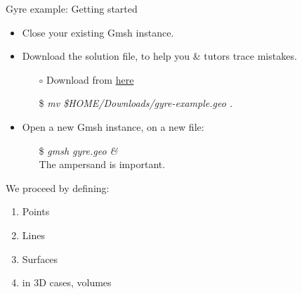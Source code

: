 \documentclass[t]{beamer}
\begin{document}
\begin{frame}{Gyre example: Getting started}
    \begin{itemize}
        \item Close your existing Gmsh instance.
        \item Download the solution file, to help you \& tutors trace mistakes.
        \begin{itemize}
            \item[$\circ$] Download from \href{http://figshare.com/s/85271e16603d11e4840b06ec4bbcf141}{here}
            \item[\$] \emph{mv \$HOME/Downloads/gyre-example.geo .}
        \end{itemize}
        \item Open a new Gmsh instance, on a new file:
        \begin{itemize}
            \item[\$] \emph{gmsh gyre.geo \&} \\ \hspace{10pt} The ampersand is important.\vspace{10pt}
        \end{itemize}
    \end{itemize}
    We proceed by defining:
    \begin{enumerate}
        \item Points
        \item Lines
        \item Surfaces
        \item in 3D cases, volumes
    \end{enumerate}
\end{frame}
\end{document}
